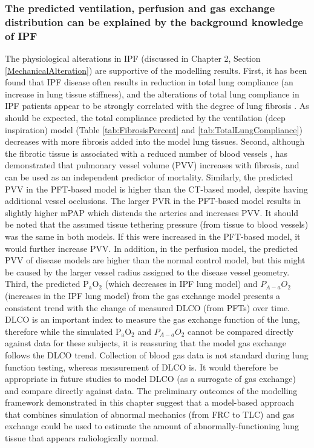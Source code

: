 \subsubsection{The predicted ventilation, perfusion and gas exchange distribution can be explained by the background knowledge of IPF}
The physiological alterations in IPF (discussed in Chapter 2, Section \ref{MechanicalAlteration}) are supportive of the modelling results. First, it has been found that IPF disease often results in reduction in total lung compliance (an increase in lung tissue stiffness), and the alterations of total lung compliance in IPF patients appear to be strongly correlated with the degree of lung fibrosis \citep{fulmer1979morphologic,plantier2018physiology}. As should be expected, the total compliance predicted by the ventilation (deep inspiration) model (Table \ref{tab:FibrosisPercent} and \ref{tab:TotalLungCompliance}) decreases with more fibrosis added into the model lung tissues. Second, although the fibrotic tissue is associated with a reduced number of blood vessels \citep{cosgrove2004pigment,ebina2004heterogeneous}, \cite{Jacob2016Mortality, Jacob2016Evaluation} has demonstrated that pulmonary vessel volume (PVV) increases with fibrosis, and can be used as an independent predictor of mortality. Similarly, the predicted PVV in the PFT-based model is higher than the CT-based model, despite having additional vessel occlusions. The larger PVR in the PFT-based model results in slightly higher mPAP which distends the arteries and increases PVV. It should be noted that the assumed tissue tethering pressure (from tissue to blood vessels) was the same in both models. If this were increased in the PFT-based model, it would further increase PVV. In addition, in the perfusion model, the predicted PVV of disease models are higher than the normal control model, but this might be caused by the larger vessel radius assigned to the disease vessel geometry.  Third, the predicted $\mathrm{P_aO_2}$ (which decreases in IPF lung model) and $P_{A-a}O_2$ (increases in the IPF lung model) from the gas exchange model presents a consistent trend with the change of measured DLCO (from PFTs) over time. DLCO is an important index to measure the gas exchange function of the lung, therefore while the simulated $\mathrm{P_aO_2}$ and $P_{A-a}O_2$ cannot be compared directly against data for these subjects, it is reassuring that the model gas exchange follows the DLCO trend. Collection of blood gas data is not standard during lung function testing, whereas measurement of DLCO is. It would therefore be appropriate in future studies to model DLCO (as a surrogate of gas exchange) and compare directly against data. The preliminary outcomes of the modelling framework demonstrated in this chapter suggest that a model-based approach that combines simulation of abnormal mechanics (from FRC to TLC) and gas exchange could be used to  estimate the amount of abnormally-functioning lung tissue that appears radiologically normal. 

